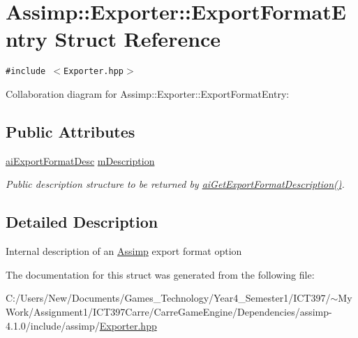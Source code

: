\hypertarget{struct_assimp_1_1_exporter_1_1_export_format_entry}{
\section{Assimp::Exporter::ExportFormatEntry Struct Reference}
\label{struct_assimp_1_1_exporter_1_1_export_format_entry}
}
{\tt \#include $<$Exporter.hpp$>$}

Collaboration diagram for Assimp::Exporter::ExportFormatEntry:\subsection*{Public Attributes}
\begin{CompactItemize}
\item 
\hypertarget{struct_assimp_1_1_exporter_1_1_export_format_entry_59f8bf48e35a70ac0540c9b65d4b891d}{
\hyperlink{structai_export_format_desc}{aiExportFormatDesc} \hyperlink{struct_assimp_1_1_exporter_1_1_export_format_entry_59f8bf48e35a70ac0540c9b65d4b891d}{mDescription}}
\label{struct_assimp_1_1_exporter_1_1_export_format_entry_59f8bf48e35a70ac0540c9b65d4b891d}

\begin{CompactList}\small\item\em Public description structure to be returned by \hyperlink{cexport_8h_dda7f2e6611f719af6c8a4a0bef0a0a2}{aiGetExportFormatDescription()}. \item\end{CompactList}\end{CompactItemize}


\subsection{Detailed Description}
Internal description of an \hyperlink{namespace_assimp}{Assimp} export format option 

The documentation for this struct was generated from the following file:\begin{CompactItemize}
\item 
C:/Users/New/Documents/Games\_\-Technology/Year4\_\-Semester1/ICT397/$\sim$My Work/Assignment1/ICT397Carre/CarreGameEngine/Dependencies/assimp-4.1.0/include/assimp/\hyperlink{_exporter_8hpp}{Exporter.hpp}\end{CompactItemize}
